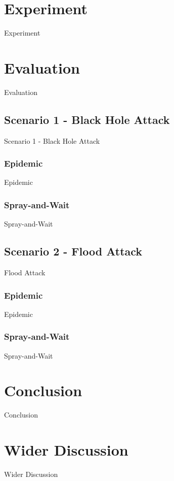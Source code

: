 \documentclass{article}
\begin{document}
\section{Experiment}
Experiment

\section{Evaluation}
Evaluation

\subsection{Scenario 1 - Black Hole Attack}
Scenario 1 - Black Hole Attack

\subsubsection{Epidemic}
Epidemic

\subsubsection{Spray-and-Wait}
Spray-and-Wait

\subsection{Scenario 2 - Flood Attack}
Flood Attack

\subsubsection{Epidemic}
Epidemic

\subsubsection{Spray-and-Wait}
Spray-and-Wait

\section{Conclusion}
Conclusion

\section{Wider Discussion}
Wider Discussion
\end{document}
